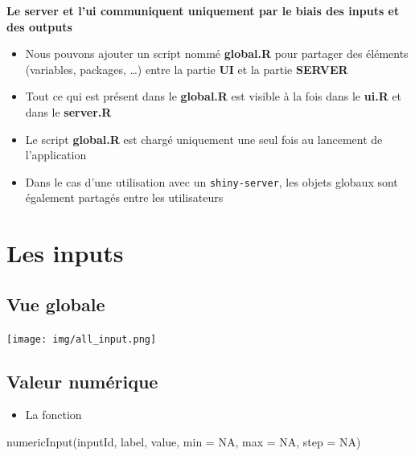 \documentclass[
]{article}
\newenvironment{Shaded}{\begin{snugshade}}{\end{snugshade}}
\newcommand{\AttributeTok}[1]{\textcolor[rgb]{0.77,0.63,0.00}{#1}}
\newcommand{\ConstantTok}[1]{\textcolor[rgb]{0.00,0.00,0.00}{#1}}
\newcommand{\FunctionTok}[1]{\textcolor[rgb]{0.00,0.00,0.00}{#1}}
\newcommand{\NormalTok}[1]{#1}
\providecommand{\tightlist}{%
  \setlength{\itemsep}{0pt}\setlength{\parskip}{0pt}}
\begin{document}
\textbf{Le server et l'ui communiquent uniquement par le biais des
inputs et des outputs}

\begin{itemize}
\item
  Nous pouvons ajouter un script nommé \textbf{global.R} pour partager
  des éléments (variables, packages, \ldots) entre la partie \textbf{UI}
  et la partie \textbf{SERVER}
\item
  Tout ce qui est présent dans le \textbf{global.R} est visible à la
  fois dans le \textbf{ui.R} et dans le \textbf{server.R}
\item
  Le script \textbf{global.R} est chargé uniquement une seul fois au
  lancement de l'application
\item
  Dans le cas d'une utilisation avec un \texttt{shiny-server}, les
  objets globaux sont également partagés entre les utilisateurs
\end{itemize}

\hypertarget{les-inputs}{%
\section{Les inputs}\label{les-inputs}}

\hypertarget{vue-globale}{%
\subsection{Vue globale}\label{vue-globale}}

\texttt{[image: img/all\_input.png]}

\hypertarget{valeur-numuxe9rique}{%
\subsection{Valeur numérique}\label{valeur-numuxe9rique}}

\begin{itemize}
\tightlist
\item
  La fonction
\end{itemize}

\begin{Shaded}
\begin{Highlighting}[]
\FunctionTok{numericInput}\NormalTok{(inputId, label, value, }\AttributeTok{min =} \ConstantTok{NA}\NormalTok{, }\AttributeTok{max =} \ConstantTok{NA}\NormalTok{, }\AttributeTok{step =} \ConstantTok{NA}\NormalTok{)}
\end{Highlighting}
\end{Shaded}
\end{document}
